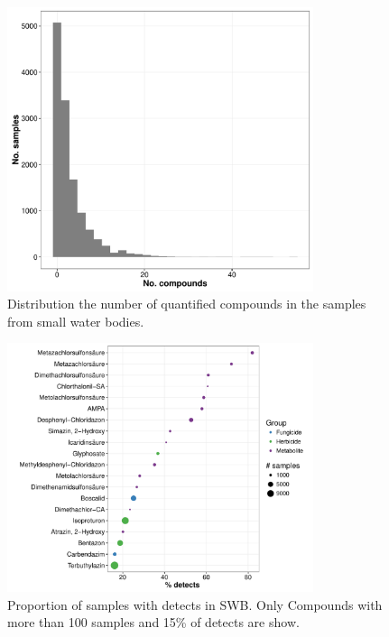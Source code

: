 \documentclass[pdftex,a4paper]{scrreprt}
\begin{document}
\begin{figure}[h]
	\centering
	\includegraphics[width = 0.8\textwidth]{pmix}
	\caption{Distribution the number of quantified compounds in the samples from small water bodies.}
	\label{fig:pmix}
\end{figure}

\begin{figure}[h]
	\centering
	\includegraphics[width = 0.8\textwidth]{pdetects}
	\caption{Proportion of samples with detects in SWB. Only Compounds with more than 100 samples and 15\% of detects are show.}
	\label{fig:pdetects}
\end{figure}





\end{document}
